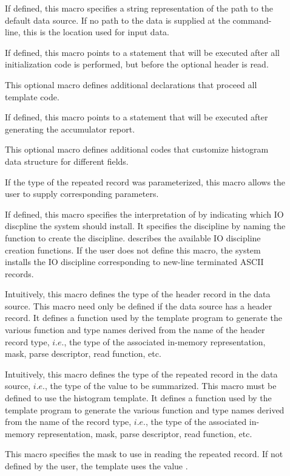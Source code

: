 \begin{description}

\item[] If defined, this macro specifies a string
  representation of the path to the default data source. If no path to
  the data is supplied at the command-line, this is the location used
  for input data. 
\item[] If defined, this macro points to a \C{}
  statement that will be executed after all initialization code is
  performed, but before the optional header is read.
\item[] This optional macro defines additional \C{}
  declarations that proceed all template code.
\item[] If defined, this macro points to a \C{}
  statement that will be executed after generating the accumulator report.
\item[] This optional macro defines additional \C{}
  codes that customize histogram data structure for different fields.
\item[] If the type of the repeated record was
  parameterized, this macro allows the user to supply corresponding
  parameters. 
\item[] If defined, this macro specifies the
  interpretation of \Precord{} by indicating which IO discpline the
  system should install. It specifies the discipline by naming the
  function to create the discipline. 
  describes the available IO discipline creation functions.  If the
  user does not define this macro, the system installs the IO
  discipline corresponding to  new-line terminated ASCII records.
\item[] Intuitively, this macro defines the type of
  the header record in the data source. This macro need only be
  defined if the data source has a header record. It defines a function used by the template program to
  generate the various function and type names derived from the name
  of the header record type, $i.e.$, the type of the associated in-memory
  representation, mask, parse descriptor, read function, etc.
\item[] Intuitively, this macro defines the type of the repeated
  record in the data source, $i.e.$, the type of the value to be
  summarized. This macro must be defined to use the histogram
  template. It defines a function used by the template program to
  generate the various function and type names derived from the name
  of the record type, $i.e.$, the type of the associated in-memory
  representation, mask, parse descriptor, read function, etc.
\item[] This macro specifies the mask to use in reading
  the repeated record. If not defined by the user, the template uses
  the value .

\end{description}
